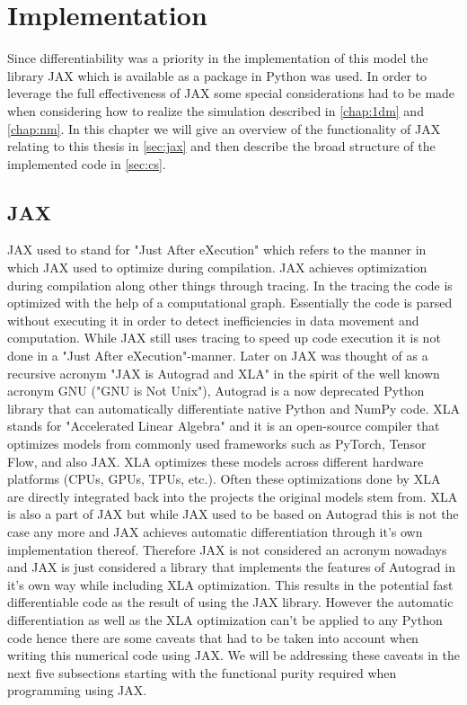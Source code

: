 \documentclass[a4paper, oneside]{discothesis}
\begin{document}
							\chapter{Implementation} \label{chap:impl}
							Since differentiability was a priority in the implementation of this model the library JAX which is available as a package in Python was used.
							In order to leverage the full effectiveness of JAX some special considerations had to be made when considering how to realize the simulation described in \autoref{chap:1dm} and \autoref{chap:nm}.
							In this chapter we  will give an overview of the functionality of JAX relating to this thesis in \autoref{sec:jax} and then describe the broad structure of the implemented code in \autoref{sec:cs}.


							\section{JAX} \label{sec:jax}
							JAX used to stand for "Just After eXecution" which refers to the manner in which JAX used to optimize during compilation.
							JAX achieves optimization during compilation along other things through tracing.
							In the tracing the code is optimized with the help of a computational graph.
							Essentially the code is parsed without executing it in order to detect inefficiencies in data movement and computation.
							While JAX still uses tracing to speed up code execution it is not done in a "Just After eXecution"-manner.
							Later on JAX was thought of as a recursive acronym "JAX is Autograd and XLA" in the spirit of the well known acronym GNU ("GNU is Not Unix"),
							Autograd is a now deprecated Python library that can automatically differentiate native Python and NumPy code.
							XLA stands for "Accelerated Linear Algebra" and it is an open-source compiler that optimizes models from commonly used frameworks such as PyTorch, Tensor Flow, and also JAX.
							XLA optimizes these models across different hardware platforms (CPUs, GPUs, TPUs, etc.).
							Often these optimizations done by XLA are directly integrated back into the projects the original models stem from.
							XLA is also a part of JAX but while JAX used to be based on Autograd this is not the case any more and JAX achieves automatic differentiation through it's own implementation thereof.
							Therefore JAX is not considered an acronym nowadays and JAX is just considered a library that implements the features of Autograd in it's own way while including XLA optimization.
							This results in the potential fast differentiable code as the result of using the JAX library.
							However the automatic differentiation as well as the XLA optimization can't be applied to any Python code hence there are some caveats that had to be taken into account when writing this numerical code using JAX.
							We will be addressing these caveats in the next five subsections starting with the functional purity required when programming using JAX.
\end{document}
